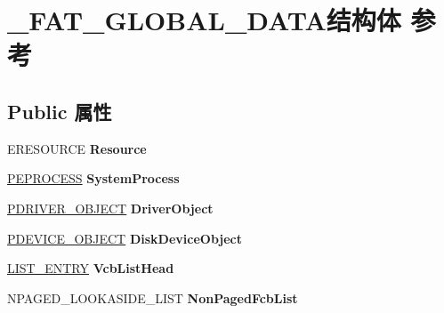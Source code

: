 \hypertarget{struct___f_a_t___g_l_o_b_a_l___d_a_t_a}{}\section{\+\_\+\+F\+A\+T\+\_\+\+G\+L\+O\+B\+A\+L\+\_\+\+D\+A\+T\+A结构体 参考}
\label{struct___f_a_t___g_l_o_b_a_l___d_a_t_a}
\subsection*{Public 属性}
\begin{DoxyCompactItemize}
\item 
\mbox{\label{struct___f_a_t___g_l_o_b_a_l___d_a_t_a_aac411a73d1906805723ef7d90b284fba}} 
E\+R\+E\+S\+O\+U\+R\+CE {\bfseries Resource}
\item 
\mbox{\label{struct___f_a_t___g_l_o_b_a_l___d_a_t_a_a6b058423f2e1911a1cb5fc944a75cfeb}} 
\hyperlink{struct___e_p_r_o_c_e_s_s}{P\+E\+P\+R\+O\+C\+E\+SS} {\bfseries System\+Process}
\item 
\mbox{\label{struct___f_a_t___g_l_o_b_a_l___d_a_t_a_a08e5def4c02200044ac2660c98b89f1b}} 
\hyperlink{struct___d_r_i_v_e_r___o_b_j_e_c_t}{P\+D\+R\+I\+V\+E\+R\+\_\+\+O\+B\+J\+E\+CT} {\bfseries Driver\+Object}
\item 
\mbox{\label{struct___f_a_t___g_l_o_b_a_l___d_a_t_a_a7fd80daaadab56a1aee187b0bc7b3506}} 
\hyperlink{struct___d_e_v_i_c_e___o_b_j_e_c_t}{P\+D\+E\+V\+I\+C\+E\+\_\+\+O\+B\+J\+E\+CT} {\bfseries Disk\+Device\+Object}
\item 
\mbox{\label{struct___f_a_t___g_l_o_b_a_l___d_a_t_a_a34ed4b2905dffaddc9d50a28089e9187}} 
\hyperlink{struct___l_i_s_t___e_n_t_r_y}{L\+I\+S\+T\+\_\+\+E\+N\+T\+RY} {\bfseries Vcb\+List\+Head}
\item 
\mbox{\label{struct___f_a_t___g_l_o_b_a_l___d_a_t_a_ae3ddfcba957fb3539a79de808c9674fe}} 
N\+P\+A\+G\+E\+D\+\_\+\+L\+O\+O\+K\+A\+S\+I\+D\+E\+\_\+\+L\+I\+ST {\bfseries Non\+Paged\+Fcb\+List}

\end{DoxyCompactItemize}
